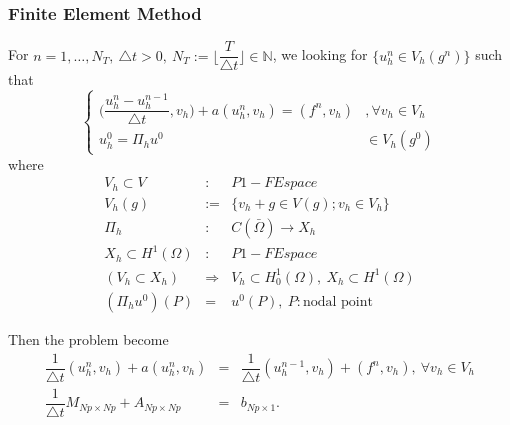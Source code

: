 \documentclass[a4paper,10pt]{article}
\begin{document}
\subsubsection{Finite Element Method}
For $ n=1, \dots, N_{T}, \ \triangle t > 0, \ N_{T} := \lfloor \dfrac{T}{\triangle t} \rfloor \in \mathbb{N} $, we looking for $ \{u_{h}^{n} \in V_{h}(g^{n}) \} $ such that
\[ \begin{cases}
\Big( \dfrac{u_{h}^{n}-u_{h}^{n-1}}{\triangle t} , v_{h} \Big) + a(u_{h}^{n}, v_{h}) = (f^{n},v_{h}) &, \forall v_{h} \in V_{h} \\
u_{h}^{0} = \Pi_{h}u^{0} &\in V_{h}(g^{0})
\end{cases} \]
where 
\begin{eqnarray} \nonumber
V_{h} \subset V &:& P1-FEspace \\ \nonumber
V_{h}(g) &:=& \{ v_{h} + g \in V(g); v_{h} \in V_{h} \} \\ \nonumber
\Pi_{h}&:& C(\bar{\Omega}) \rightarrow X_{h} \\ \nonumber
X_{h} \subset H^{1}(\Omega) &:& P1-FEspace \\ \nonumber
(V_{h} \subset X_{h}) &\Rightarrow& V_{h} \subset H_{0}^{1}(\Omega), \ X_{h} \subset H^{1}(\Omega)\\ \nonumber
(\Pi_{h} u^{0})(P) &=& u^{0}(P), \ P : \text{nodal point}
\end{eqnarray}

Then the problem become
\begin{eqnarray}\nonumber
\dfrac{1}{\triangle t} (u_{h}^{n} , v_{h}) + a(u_{h}^{n} , v_{h}) &=& \dfrac{1}{\triangle t} (u_{h}^{n-1} , v_{h}) + (f^{n},v_{h}), \ \forall v_{h} \in V_{h} \\ \nonumber
\dfrac{1}{\triangle t} M_{Np \times Np} + A_{Np \times Np} &=& b_{Np \times 1}. 
\end{eqnarray}
\end{document}
